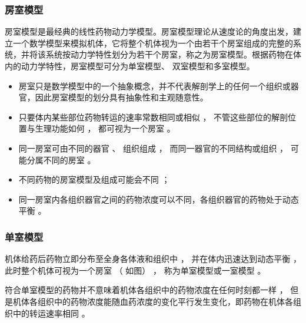 \documentclass[dvipsnames, svgnames, x11names]{beamer}
\begin{document}
\begin{frame}
	\frametitle{房室模型}
	房室模型是最经典的线性药物动力学模型。房室模型理论从速度论的角度出发，建立一个数学模型来模拟机体，它将整个机体视为一个由若干个房室组成的完整的系统，并将该系统按动力学特性划分为若干个房室，称之为房室模型。根据药物在体内的动力学特性，房室模型可分为单室模型、 双室模型和多室模型。
	
	\begin{itemize}
	  \item 房室只是数学模型中的一个抽象概念，并不代表解剖学上的任何一个组织或器官，因此房室模型的划分具有抽象性和主观随意性。
	  \item 只要体内某些部位药物转运的速率常数相同或相似 ， 不管这些部位的解剖位置与生理功能如何 ， 都可视为一个房室 。
	  \item 同一房室可由不同的器官 、 组织组成 ， 而同一器官的不同结构或组织 ， 可能分属不同的房室 。
	  \item 不同药物的房室模型及组成可能会不同 ；
	  \item 同一房室内各组织器官之间的药物浓度可以不同，各组织器官的药物处于动态平衡 。
	\end{itemize}
	  
\end{frame}


\begin{frame}
	\frametitle{单室模型}
	\begin{minipage}{0.58\linewidth}
		机体给药后药物立即分布至全身各体液和组织中 ， 并在体内迅速达到动态平衡 ， 此时整个机体可视为一个房室 （ 如图） ， 称为单室模型或一室模型 。

		符合单室模型的药物并不意味着机体各组织中的药物浓度在任何时刻都一样 ， 但是机体各组织中的药物浓度能随血药浓度的变化平行发生变化，即药物在机体各组织中的转运速率相同 。
	\end{minipage}\hfill
	\begin{minipage}{0.38\linewidth}
		\begin{center}
		\end{center}
	\end{minipage}
\end{frame}
\end{document}
